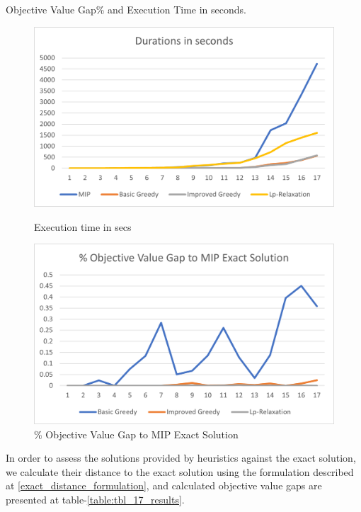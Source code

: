 \documentclass[11pt]{article}
\begin{document}
        \begin{table}[htb!]
        \caption{Objective Value Gap\% and Execution Time in seconds.}\label{table:tbl_17_results}
        \begin{adjustbox}{max width=1\textwidth}
        \end{adjustbox}
        \label{tab:test}
        \end{table}

        \begin{figure}[htb!]
        \centering
        \begin{minipage}{.6\textwidth}
            \centering
            \includegraphics[width=.7\linewidth]{durations17.png}
            \caption{Execution time in secs}
            \label{fig:fig_durations17}
        \end{minipage}%
        \begin{minipage}{.6\textwidth}
            \centering
            \includegraphics[width=.7\linewidth]{performance17.png}
            \caption{\% Objective Value Gap to MIP Exact Solution}
            \label{fig:fig_value_gap17}
        \end{minipage}
        \end{figure}
\newpage
In order to assess the solutions provided by heuristics against the exact solution, we calculate their distance to the exact solution using the formulation described at \equationautorefname \eqref{exact_distance_formulation}, and calculated objective value gaps are presented at table-\ref{table:tbl_17_results}.\\
\end{document}
